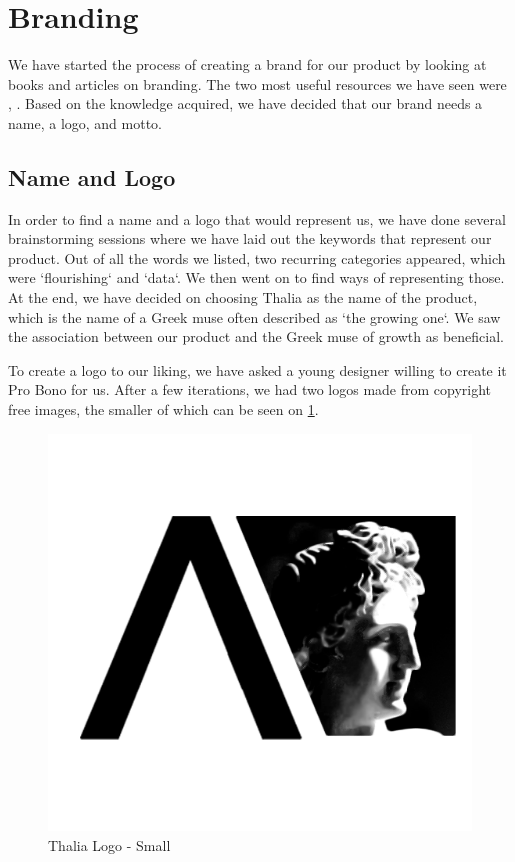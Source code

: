 \documentclass[main.tex]{subfiles}
\begin{document}
\section{Branding}
We have started the process of creating a brand for our product by looking at books and articles on branding. The two most useful resources we have seen were  \cite{basics_branding}, \cite{clifton_2009}. Based on the knowledge acquired, we have decided that our brand needs a name, a logo, and motto.

\subsection{Name and Logo}
In order to find a name and a logo that would represent us, we have done several brainstorming sessions where we have laid out the keywords that represent our product. Out of all the words we listed, two recurring categories appeared, which were `flourishing` and `data`. We then went on to find ways of representing those. At the end, we have decided on choosing Thalia as the name of the product, which is the name of a Greek muse often described as `the growing one`. We saw the association between our product and the Greek muse of growth as beneficial.

To create a logo to our liking, we have asked a young designer willing to create it Pro Bono for us. After a few iterations, we had two logos made from copyright free images, the smaller of which can be seen on \figurename{\ref{small_logo}}.

\begin{figure}[H]
    \centering
    \includegraphics[scale=0.4]{00Branding/00Pictures/small_logo.png}
    \caption{Thalia Logo - Small}
    \label{small_logo}
\end{figure}
\end{document}
